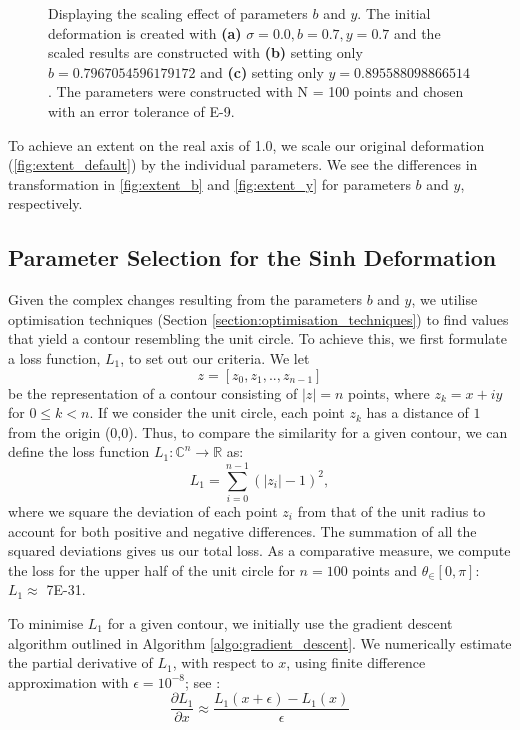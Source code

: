 \documentclass[a4paper]{report}
\begin{document}
\begin{figure}[H]
    \caption{Displaying the scaling effect of parameters $b$ and $y$. The initial deformation is created with \textbf{(a)} $\sigma = 0.0, b = 0.7, y = 0.7$ and the scaled results are constructed with \textbf{(b)} setting only $b = 0.7967054596179172$ and \textbf{(c)} setting only $y = 0.895588098866514$. The parameters were constructed with N = 100 points and chosen with an error tolerance of E-9.}
\end{figure}

To achieve an extent on the real axis of 1.0, we scale our original deformation (\autoref{fig:extent_default}) by the individual parameters. We see the differences in transformation in \autoref{fig:extent_b} and \autoref{fig:extent_y} for parameters $b$ and $y$, respectively.

\subsection{Parameter Selection for the Sinh Deformation}\label{section:parameter_selection}
Given the complex changes resulting from the parameters $b$ and $y$, we utilise optimisation techniques (Section \ref{section:optimisation_techniques}) to find values that yield a contour resembling the unit circle. To achieve this, we first formulate a loss function, $L_1$, to set out our criteria. We let 
\begin{equation*}
	z = [z_0, z_1, .., z_{n-1}]
\end{equation*}
be the representation of a contour consisting of $|z| = n$ points, where $z_k = x + iy$ for $0 \leq k < n$. If we consider the unit circle, each point $z_k$ has a distance of $1$ from the origin (0,0). Thus, to compare the similarity for a given contour, we can define the loss function $L_1: \mathbb{C}^n \rightarrow \mathbb{R}$ as:
\begin{equation}
L_1 = \sum_{i=0}^{n-1} \left( |z_i| - 1 \right)^2,
\end{equation}
where we square the deviation of each point $z_i$ from that of the unit radius to account for both positive and negative differences. The summation of all the squared deviations gives us our total loss. As a comparative measure, we compute the loss for the upper half of the unit circle for $n = 100$ points and $\theta_\in [0, \pi]$: $L_1\approx$ 7E-31.

To minimise $L_1$ for a given contour, we initially use the gradient descent algorithm outlined in Algorithm \ref{algo:gradient_descent}. We numerically estimate the partial derivative of $L_1$, with respect to $x$, using finite difference approximation with $\epsilon = 10^{-8}$; see \citet{burden1997numerical}:
\begin{equation}\label{eq:finite_diff}
\frac{\partial L_1}{\partial x} \approx \frac{L_1(x + \epsilon) - L_1(x)}{\epsilon}
\end{equation}
\end{document}

